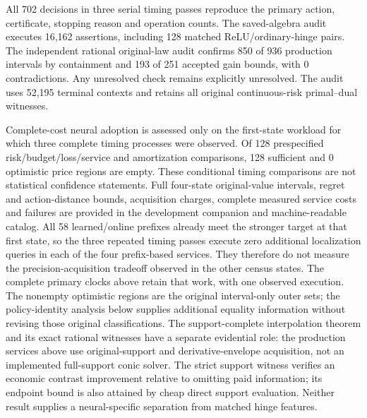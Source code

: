 All 702 decisions in three serial timing passes reproduce the primary action, certificate, stopping reason and operation counts. The saved-algebra audit executes 16,162 assertions, including 128 matched ReLU/ordinary-hinge pairs. The independent rational original-law audit confirms 850 of 936 production intervals by containment and 193 of 251 accepted gain bounds, with 0 contradictions. Any unresolved check remains explicitly unresolved. The audit uses 52,195 terminal contexts and retains all original continuous-risk primal--dual witnesses.

Complete-cost neural adoption is assessed only on the first-state workload for which three complete timing processes were observed. Of 128 prespecified risk/budget/loss/service and amortization comparisons, 128 sufficient and 0 optimistic price regions are empty. These conditional timing comparisons are not statistical confidence statements. Full four-state original-value intervals, regret and action-distance bounds, acquisition charges, complete measured service costs and failures are provided in the development companion and machine-readable catalog.
All 58 learned/online prefixes already meet the stronger target at that first state, so the three repeated timing passes execute zero additional localization queries in each of the four prefix-based services. They therefore do not measure the precision-acquisition tradeoff observed in the other census states. The complete primary clocks above retain that work, with one observed execution. The nonempty optimistic regions are the original interval-only outer sets; the policy-identity analysis below supplies additional equality information without revising those original classifications.
The support-complete interpolation theorem and its exact rational witnesses have a separate evidential role: the production services above use original-support and derivative-envelope acquisition, not an implemented full-support conic solver. The strict support witness verifies an economic contrast improvement relative to omitting paid information; its endpoint bound is also attained by cheap direct support evaluation. Neither result supplies a neural-specific separation from matched hinge features.
